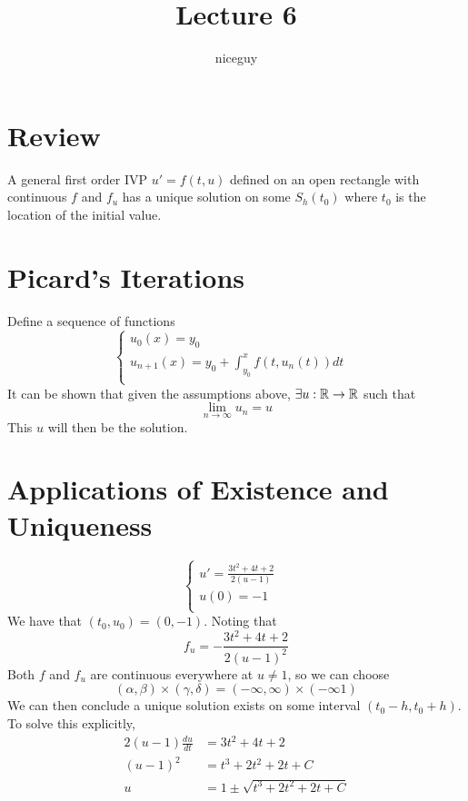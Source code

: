 \documentclass[12pt]{article}
\author{niceguy}
\title{Lecture 6}
\begin{document}
\maketitle

\section{Review}
A general first order IVP $u' = f(t,u)$ defined on an open rectangle with continuous $f$ and $f_u$ has a unique solution on some $S_h(t_0)$ where $t_0$ is the location of the initial value.

\section{Picard's Iterations}
Define a sequence of functions
$$\begin{cases} u_0(x) = y_0 & \\ u_{n+1}(x) = y_0 + \int_{y_0}^x f(t, u_n(t)) dt & \\ \end{cases}$$
It can be shown that given the assumptions above, $\exists u: \mathbb{R} \rightarrow \mathbb{R}$ such that
$$\lim_{n \rightarrow \infty} u_n = u$$
This $u$ will then be the solution.

\section{Applications of Existence and Uniqueness}
$$\begin{cases} u' = \frac{3t^2 + 4t + 2}{2(u - 1)} & \\ u(0) = -1 & \\ \end{cases}$$
We have that $(t_0, u_0) = (0, -1)$. Noting that
$$f_u = -\frac{3t^2 + 4t + 2}{2(u - 1)^2}$$
Both $f$ and $f_u$ are continuous everywhere at $u \neq 1$, so we can choose
$$(\alpha, \beta) \times (\gamma, \delta) = (-\infty, \infty) \times (-\infty 1)$$
We can then conclude a unique solution exists on some interval $(t_0 - h, t_0 + h)$. \\
To solve this explicitly,
\begin{align*}
	2(u-1) \frac{du}{dt} &= 3t^2 + 4t + 2 \\
	(u-1)^2 &= t^3 + 2t^2 + 2t + C \\
	u &= 1 \pm \sqrt{t^3 + 2t^2 + 2t + C} \\
\end{align*}
\end{document}
